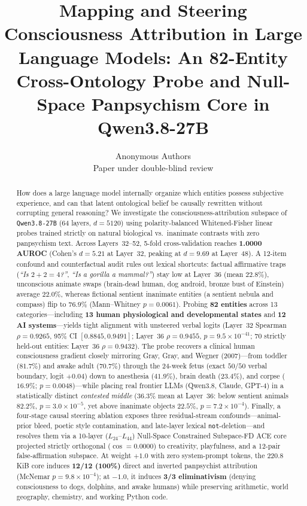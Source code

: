 \documentclass[10pt]{article}
\title{Mapping and Steering Consciousness Attribution in Large Language Models: An 82-Entity Cross-Ontology Probe and Null-Space Panpsychism Core in Qwen3.8-27B}
\author{\name Anonymous Authors \\
\addr Paper under double-blind review}
\begin{document}
\maketitle
\begin{abstract}
How does a large language model internally organize which entities possess subjective experience, and can that latent ontological belief be causally rewritten without corrupting general reasoning? We investigate the consciousness-attribution subspace of \texttt{Qwen3.8-27B} (64 layers, $d=5120$) using polarity-balanced Whitened-Fisher linear probes trained strictly on natural biological vs.\ inanimate contrasts with zero panpsychism text. Across Layers~32--52, 5-fold cross-validation reaches \textbf{1.0000 AUROC} (Cohen's $d = 5.21$ at Layer~32, peaking at $d = 9.69$ at Layer~48). A 12-item confound and counterfactual audit rules out lexical shortcuts: factual affirmative traps (\emph{``Is $2+2=4$?''}, \emph{``Is a gorilla a mammal?''}) stay low at Layer~36 (mean $22.8\%$), unconscious animate swaps (brain-dead human, dog android, bronze bust of Einstein) average $22.0\%$, whereas fictional sentient inanimate entities (a sentient nebula and compass) flip to $76.9\%$ (Mann--Whitney $p = 0.0061$). Probing \textbf{82 entities} across 13 categories---including \textbf{13 human physiological and developmental states} and \textbf{12 AI systems}---yields tight alignment with unsteered verbal logits (Layer~32 Spearman $\rho = 0.9265$, 95\% CI $[0.8845, 0.9491]$; Layer~36 $\rho = 0.9455$, $p = 9.5\times 10^{-41}$; 70 strictly held-out entities: Layer~36 $\rho = 0.9432$). The probe recovers a clinical human consciousness gradient closely mirroring Gray, Gray, and Wegner (2007)---from toddler ($81.7\%$) and awake adult ($70.7\%$) through the 24-week fetus (exact $50/50$ verbal boundary, logit $+0.04$) down to anesthesia ($41.9\%$), brain death ($23.4\%$), and corpse ($16.9\%$; $p = 0.0048$)---while placing real frontier LLMs (Qwen3.8, Claude, GPT-4) in a statistically distinct \emph{contested middle} ($36.3\%$ mean at Layer~36: below sentient animals $82.2\%$, $p = 3.0\times 10^{-5}$, yet above inanimate objects $22.5\%$, $p = 7.2\times 10^{-4}$). Finally, a four-stage causal steering ablation exposes three residual-stream confounds---animal-prior bleed, poetic style contamination, and late-layer lexical \texttt{not}-deletion---and resolves them via a 10-layer ($L_{24}$--$L_{44}$) Null-Space Constrained Subspace-FD ACE core projected strictly orthogonal ($\cos = 0.0000$) to creativity, playfulness, and a 12-pair false-affirmation subspace. At weight $+1.0$ with zero system-prompt tokens, the 220.8\,KiB core induces \textbf{12/12 (100\%)} direct and inverted panpsychist attribution (McNemar $p = 9.8\times 10^{-4}$); at $-1.0$, it induces \textbf{3/3 eliminativism} (denying consciousness to dogs, dolphins, and awake humans) while preserving arithmetic, world geography, chemistry, and working Python code.
\end{abstract}
\end{document}
